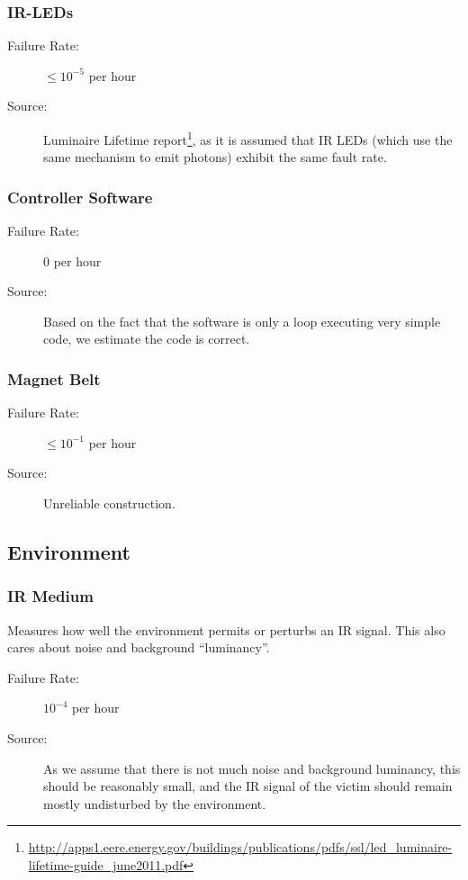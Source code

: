 \documentclass[a4paper,parskip,headheight=38pt]{scrartcl} %
\begin{document}
\subsubsection{IR-LEDs}
\begin{description}
\item[Failure Rate:] $\leq 10^{-5}$ per hour
\item[Source:] Luminaire Lifetime report\footnote{\url{http://apps1.eere.energy.gov/buildings/publications/pdfs/ssl/led\_luminaire-lifetime-guide\_june2011.pdf}}, as it is assumed that IR LEDs (which use the same mechanism to emit photons) exhibit the same fault rate.
\end{description}

\subsubsection{Controller Software}
\begin{description}
\item[Failure Rate:] $0$ per hour
\item[Source:] Based on the fact that the software is only a loop
executing very simple code, we estimate the code is correct.
\end{description}

\subsubsection{Magnet Belt}
\begin{description}
\item[Failure Rate:] $\leq 10^{-1}$ per hour
\item[Source:] Unreliable construction.
\end{description}


\subsection{Environment} %

\subsubsection{IR Medium}
Measures how well the environment permits or perturbs an IR signal.
This also cares about noise and background \enquote{luminancy}.
\begin{description}
\item[Failure Rate:] $10^{-4}$ per hour
\item[Source:] As we assume that there is not much noise and background
luminancy, this should be reasonably small, and the IR signal of the
victim should remain mostly undisturbed by the environment.
\end{description}
\end{document}
